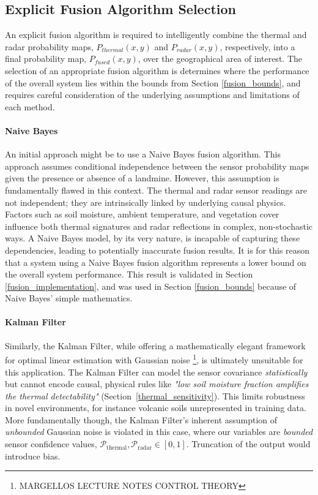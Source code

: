\subsection{Explicit Fusion Algorithm Selection}

    An explicit fusion algorithm is required to intelligently combine the thermal and radar probability maps, \(P_{thermal}(x, y)\) and \(P_{radar}(x, y)\), respectively, into a final probability map, \(P_{fused}(x, y)\), over the geographical area of interest. The selection of an appropriate fusion algorithm is determines where the performance of the overall system lies within the bounds from Section \ref{fusion_bounds}, and requires careful consideration of the underlying assumptions and limitations of each method.
    
    \paragraph{Naive Bayes}
    
        An initial approach might be to use a Naive Bayes fusion algorithm. This approach assumes conditional independence between the sensor probability maps given the presence or absence of a landmine. However, this assumption is fundamentally flawed in this context. The thermal and radar sensor readings are not independent; they are intrinsically linked by underlying causal physics. Factors such as soil moisture, ambient temperature, and vegetation cover influence both thermal signatures and radar reflections in complex, non-stochastic ways. A Naive Bayes model, by its very nature, is incapable of capturing these dependencies, leading to potentially inaccurate fusion results. It is for this reason that a system using a Naive Bayes fusion algorithm represents a lower bound on the overall system performance. This result is validated in Section \ref{fusion_implementation}, and was used in Section \ref{fusion_bounds} because of Naive Bayes' simple mathematics.
    
    \paragraph{Kalman Filter}
    
        Similarly, the Kalman Filter, while offering a mathematically elegant framework for optimal linear estimation with Gaussian noise \footnote{MARGELLOS LECTURE NOTES CONTROL THEORY}, is ultimately unsuitable for this application. The Kalman Filter can model the sensor covariance \textit{statistically} but cannot encode causal, physical rules like \textit{"low soil moisture fraction amplifies the thermal detectability"} (Section~\ref{thermal_sensitivity}). This limits robustness in novel environments, for instance volcanic soils unrepresented in training data. More fundamentally though, the Kalman Filter's inherent assumption of \textit{unbounded} Gaussian noise is violated in this case, where our variables are \textit{bounded} sensor confidence values, \(\mathcal{P}_{\text{thermal}}, \mathcal{P}_{\text{radar}} \in [0,1]\). Truncation of the output would introduce bias.
    
